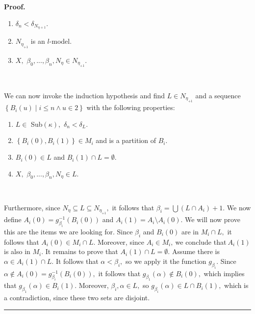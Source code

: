 \documentclass{article}%
\newenvironment{proof}[1][Proof]{\noindent\textbf{#1.} }{\ \rule{0.5em}{0.5em}}
\begin{document}
\begin{proof}
\begin{enumerate}
\item $\delta_{n}<\delta_{N_{\eta+1}}.$

\item $N_{\eta_{+1}}$ is an $l$-model.

\item $X,$ $\beta_{0},...,\beta_{n},N_{\eta}\in N_{\eta_{+1}}.$
\end{enumerate}

\qquad\ \ \ 

We can now invoke the induction hypothesis and find $L\in N_{\eta_{+1}}$ and a
sequence $\left\{  B_{i}\left(  u\right)  \mid i\leq n\wedge u\in2\right\}  $
with the following properties:

\begin{enumerate}
\item $L\in$ \textsf{Sub}$\left(  \kappa\right)  ,$ $\delta_{n}<\delta_{L}.$

\item $\left\{  B_{i}\left(  0\right)  ,B_{i}\left(  1\right)  \right\}  \in
M_{i}$ and is a partition of $B_{i}.$

\item $B_{i}\left(  0\right)  \in L$ and $B_{i}\left(  1\right)  \cap
L=\emptyset.$

\item $X,$ $\beta_{0},...,\beta_{n},N_{\eta}\in L.$
\end{enumerate}

\qquad\ \ \qquad\ \ \ 

Furthermore, since $N_{\eta}\subseteq L\subseteq N_{\eta_{+1}},$ it follows
that $\beta_{i}=%
{\displaystyle\bigcup}
\left(  L\cap A_{i}\right)  +1.$ We now define $A_{i}\left(  0\right)
=g_{\beta_{i}}^{-1}\left(  B_{i}\left(  0\right)  \right)  $ and $A_{i}\left(
1\right)  =A_{i}\setminus A_{i}\left(  0\right)  .$ We will now prove this are
the items we are looking for. Since $\beta_{i}$ and $B_{i}\left(  0\right)  $
are in $M_{i}\cap L,$ it follows that $A_{i}\left(  0\right)  \in M_{i}\cap
L.$ Moreover, since $A_{i}\in M_{i},\ $we conclude that$\ A_{i}\left(
1\right)  $ is also in $M_{i}.$ It remains to prove that $A_{i}\left(
1\right)  \cap L=\emptyset.$ Assume there is $\alpha\in A_{i}\left(  1\right)
\cap L.$ It follows that $\alpha<\beta_{i},$ so we apply it the function
$g_{\beta_{i}}.$ Since $\alpha\notin A_{i}\left(  0\right)  =g_{\beta_{i}%
}^{-1}\left(  B_{i}\left(  0\right)  \right)  ,$ it follows that $g_{\beta
_{1}}\left(  \alpha\right)  \notin B_{i}\left(  0\right)  ,$ which implies
that $g_{\beta_{1}}\left(  \alpha\right)  \in B_{i}\left(  1\right)  .$
Moreover, $\beta_{i},\alpha\in L,$ so $g_{\beta_{i}}\left(  \alpha\right)  \in
L\cap B_{i}\left(  1\right)  ,$ which is a contradiction, since these two sets
are disjoint.
\end{proof}
\end{document}
